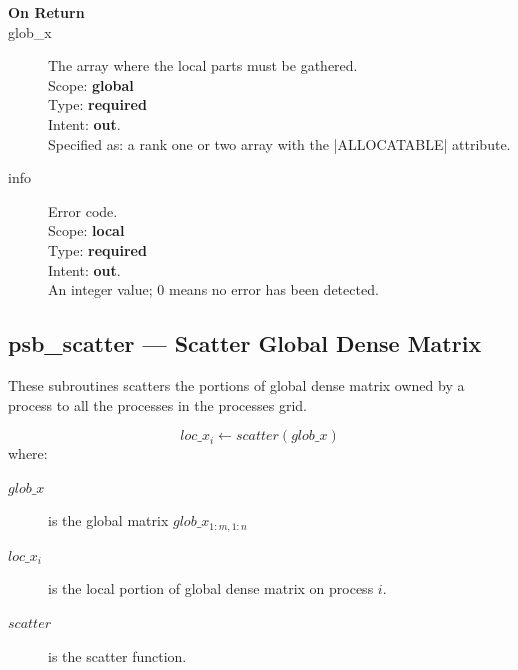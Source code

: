 \begin{description}
\item[\bf On Return] 
\item[glob\_x] The array where the local parts must be gathered.\\
Scope: {\bf global} \\
Type: {\bf required}\\
Intent: {\bf out}.\\
Specified as: a rank one or two array with the \fortinline|ALLOCATABLE| attribute.
\item[info] Error code.\\
Scope: {\bf local} \\
Type: {\bf required} \\
Intent: {\bf out}.\\
An integer value; 0 means no error has been detected. 
\end{description}

%
%

\clearpage\subsection{psb\_scatter --- Scatter Global Dense Matrix}

These subroutines scatters the portions of global dense matrix owned
by a process to all the processes in the processes grid.

\[ loc\_x_i \leftarrow scatter(glob\_x) \]
where:
\begin{description}
\item[$glob\_x$] is the global matrix $glob\_x_{1:m,1:n}$
\item[$loc\_x_i$] is the local portion of global dense matrix on
process $i$.
\item[$scatter$] is the scatter function.
\end{description}

